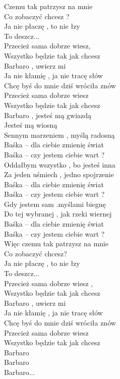 
\begin{text}
    Czemu tak patrzysz na mnie\\
    Co zobaczyć chcesz ?\\
    Ja nie płaczę , to nie łzy\\
    To deszcz...\\
    Przecież sama dobrze wiesz,\\
    Wszystko będzie tak jak chcesz\\
    Barbaro , uwierz mi\\
    Ja nie kłamię , ja nie tracę słów\\
    Chcę byś do mnie dziś wróciła znów\\
    Przecież sama dobrze wiesz\\
    Wszystko będzie tak jak chcesz\\
    Barbaro , jesteś mą gwiazdą\\
    Jesteś mą wiosną\\
    Sennym marzeniem , myślą radosną\\
    Baśka -- dla ciebie zmienię świat\\
    Baśka -- czy jestem ciebie wart ?\\
    Oddałbym wszystko , bo jesteś inna\\
    Za jeden uśmiech , jedno spojrzenie\\
    Baśka -- dla ciebie zmienię świat\\
    Baśka -- czy jestem ciebie wart ?\\
    Gdy jestem sam .myślami biegnę\\
    Do tej wybranej , jak rzeki wiernej\\
    Baśka -- dla ciebie zmienię świat\\
    Baśka -- czy jestem ciebie wart ?\\
    Więc czemu tak patrzysz na mnie\\
    Co zobaczyć chcesz?\\
    Ja nie płaczę , to nie łzy\\
    To deszcz...\\
    Przecież sama dobrze wiesz ,\\
    Wszystko będzie tak jak chcesz\\
    Barbaro , uwierz mi\\
    Ja nie kłamię , ja nie tracę słów\\
    Chcę byś do mnie dziś wróciła znów\\
    Przecież sama dobrze wiesz\\
    Wszystko będzie tak jak chcesz\\
    Barbaro\\
    Barbaro\\
    Barbaro...
\end{text}
\begin{chord}

\end{chord}